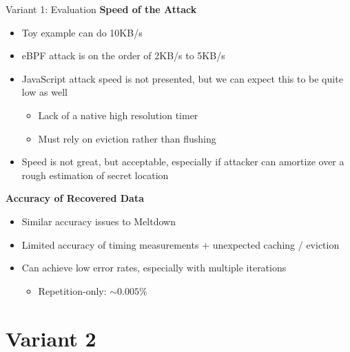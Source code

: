 \documentclass[10pt, dvipsnames, aspectratio=169]{beamer}
\begin{document}
\begin{frame}[c, fragile]{Variant 1: Evaluation}{}
  {\bf Speed of the Attack}
  \begin{itemize}
    \item Toy example can do 10KB/s
    \item eBPF attack is on the order of 2KB/s to 5KB/s
    \item JavaScript attack speed is not presented, but we can expect this to be quite low as well
    \begin{itemize}
      \item Lack of a native high resolution timer
      \item Must rely on eviction rather than flushing
    \end{itemize}
    \item Speed is not great, but acceptable, especially if attacker can amortize over a rough estimation of secret location
  \end{itemize}

  \vfill
  {\bf Accuracy of Recovered Data}
  \begin{itemize}
    \item Similar accuracy issues to Meltdown
    \item Limited accuracy of timing measurements + unexpected caching / eviction
    \item Can achieve low error rates, especially with multiple iterations
    \begin{itemize}
      \item Repetition-only: $\sim0.005\%$
    \end{itemize}
  \end{itemize}
\end{frame}

\section{Variant 2}
\end{document}
